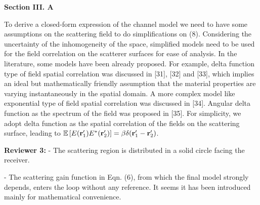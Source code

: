 \documentclass[a4paper,12pt]{article}
\begin{document}
\begin{framed}
	{\bf Section III. A}

    To derive a closed-form expression of the channel model we need to have some assumptions on the scattering field to do simplifications on (8). {\color{red} Considering the uncertainty of the inhomogeneity of the space, simplified models need to be used for the field correlation on the scatterer surfaces for ease of analysis. In the literature, some models have been already proposed. For example, delta function type of field spatial correlation was discussed in [31], [32] and [33], which implies an ideal but mathematically friendly assumption that the material properties are varying instantaneously in the spatial domain. A more complex model like exponential type of field spatial correlation was discussed in [34]. Angular delta function as the spectrum of the field was proposed in [35]. For simplicity, we adopt delta function as the spatial correlation of the fields on the scattering surface, leading to $\mathbb{E}\left[ E({\bf r}_1')E^{*}({\bf r}_2') \right] = \beta \delta({\bf r}_1'-{\bf r}_2')$.}

\end{framed}


\textbf{Reviewer 3:}
-   The scattering region is distributed in a solid circle facing the receiver.

-   The scattering gain function in Eqn. (6), from which the final model strongly depends, enters the loop without any reference. It seems it has been introduced mainly for mathematical convenience.

{}
\end{document}
